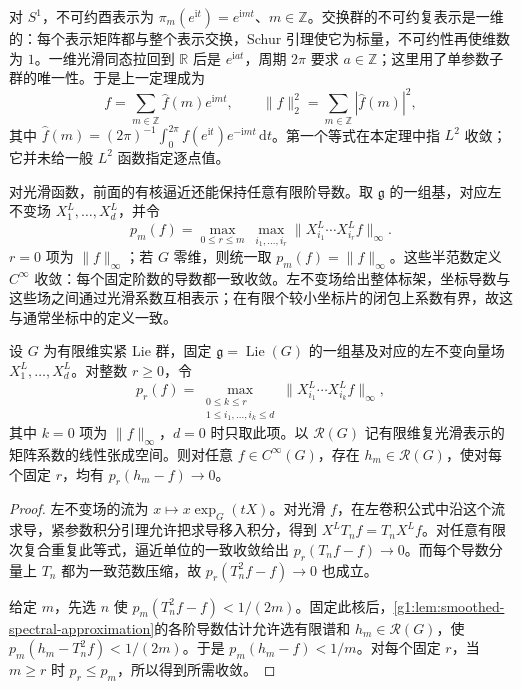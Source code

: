\begin{example}\label{g1:ex:peter-weyl-circle}
	对 \(S^1\)，不可约酉表示为 \(\pi_m(e^{\mathrm{i}t})=e^{\mathrm{i}mt}\)、\(m\in\mathbb Z\)。交换群的不可约复表示是一维的：每个表示矩阵都与整个表示交换，Schur 引理使它为标量，不可约性再使维数为 \(1\)。一维光滑同态拉回到 \(\mathbb R\) 后是 \(e^{\mathrm{i}at}\)，周期 \(2\pi\) 要求 \(a\in\mathbb Z\)；这里用了单参数子群的唯一性。于是上一定理成为
	\[
		f=\sum_{m\in\mathbb Z}\widehat f(m)e^{\mathrm{i}mt},
		\qquad \|f\|_2^2=\sum_{m\in\mathbb Z}|\widehat f(m)|^2,
	\]
	其中 \(\widehat f(m)=(2\pi)^{-1}\int_0^{2\pi}f(e^{\mathrm{i}t})e^{-\mathrm{i}mt}\,\mathrm{d}t\)。第一个等式在本定理中指 \(L^2\) 收敛；它并未给一般 \(L^2\) 函数指定逐点值。
\end{example}

对光滑函数，前面的有核逼近还能保持任意有限阶导数。取 \(\mathfrak g\) 的一组基，对应左不变场 \(X_1^L,\ldots,X_d^L\)，并令
\[
	p_m(f)=\max_{0\le r\le m}\ \max_{i_1,\ldots,i_r}
	\|X_{i_1}^L\cdots X_{i_r}^Lf\|_\infty.
\]
\(r=0\) 项为 \(\|f\|_\infty\)；若 \(G\) 零维，则统一取 \(p_m(f)=\|f\|_\infty\)。这些半范数定义 \(C^\infty\) 收敛：每个固定阶数的导数都一致收敛。左不变场给出整体标架，坐标导数与这些场之间通过光滑系数互相表示；在有限个较小坐标片的闭包上系数有界，故这与通常坐标中的定义一致。

\begin{proposition}\label{g1:prop:peter-weyl-smooth-density}
	设 \(G\) 为有限维实紧 Lie 群，固定 \(\mathfrak g=\operatorname{Lie}(G)\) 的一组基及对应的左不变向量场 \(X_1^L,\ldots,X_d^L\)。对整数 \(r\ge0\)，令
	\[
		p_r(f)=\max_{\substack{0\le k\le r\\1\le i_1,\ldots,i_k\le d}}
		\|X_{i_1}^L\cdots X_{i_k}^Lf\|_\infty,
	\]
	其中 \(k=0\) 项为 \(\|f\|_\infty\)，\(d=0\) 时只取此项。以 \(\mathcal R(G)\) 记有限维复光滑表示的矩阵系数的线性张成空间。则对任意 \(f\in C^\infty(G)\)，存在 \(h_m\in\mathcal R(G)\)，使对每个固定 \(r\)，均有 \(p_r(h_m-f)\to0\)。
\end{proposition}
\begin{proof}
	左不变场的流为 \(x\mapsto x\exp_G(tX)\)。对光滑 \(f\)，在左卷积公式中沿这个流求导，紧参数积分引理允许把求导移入积分，得到 \(X^LT_nf=T_nX^Lf\)。对任意有限次复合重复此等式，逼近单位的一致收敛给出 \(p_r(T_nf-f)\to0\)。而每个导数分量上 \(T_n\) 都为一致范数压缩，故 \(p_r(T_n^2f-f)\to0\) 也成立。

	给定 \(m\)，先选 \(n\) 使 \(p_m(T_n^2f-f)<1/(2m)\)。固定此核后，\cref{g1:lem:smoothed-spectral-approximation}的各阶导数估计允许选有限谱和 \(h_m\in\mathcal R(G)\)，使 \(p_m(h_m-T_n^2f)<1/(2m)\)。于是 \(p_m(h_m-f)<1/m\)。对每个固定 \(r\)，当 \(m\ge r\) 时 \(p_r\le p_m\)，所以得到所需收敛。
\end{proof}

